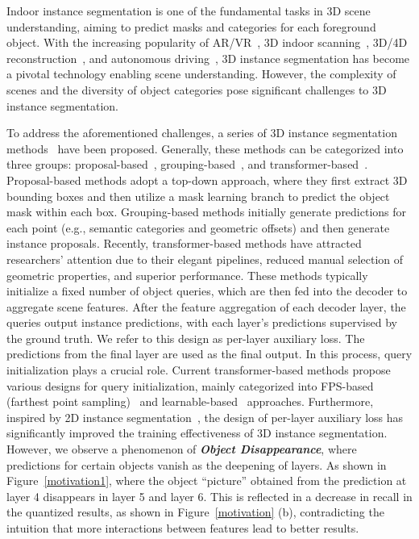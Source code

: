 \label{sec:intro}
Indoor instance segmentation is one of the fundamental tasks in 3D scene understanding, aiming to predict masks and categories for each foreground object. With the increasing popularity of AR/VR~\cite{park2020deep,manni2021snap2cad}, 3D indoor scanning~\cite{lehtola2017comparison,halber2019rescan}, 3D/4D reconstruction~\cite{wu20244d,zhu2024motiongs,lu2024dn,luiten2023dynamic,lu2024align3r,zhang2024monst3r}, and autonomous driving~\cite{neven2018towards,yurtsever2020survey}, 3D instance segmentation has become a pivotal technology enabling scene understanding. However, the complexity of scenes and the diversity of object categories pose significant challenges to 3D instance segmentation.


%
To address the aforementioned challenges, a series of 3D instance segmentation methods~\cite{yi2019gspn,hou20193d,yang2019learning,engelmann20203d,liu2020learning, chen2021hierarchical,liang2021instance,vu2022softgroup,schult2022mask3d,sun2023superpoint,lu2023query,lai2023mask} have been proposed. Generally, these methods can be categorized into three groups: proposal-based~\cite{yi2019gspn,hou20193d,yang2019learning}, grouping-based~\cite{engelmann20203d,liu2020learning,jiang2020pointgroup,chen2021hierarchical,liang2021instance,vu2022softgroup}, and transformer-based~\cite{schult2022mask3d,sun2023superpoint,lu2023query,lai2023mask}. Proposal-based methods adopt a top-down approach, where they first extract 3D bounding boxes and then utilize a mask learning branch to predict the object mask within each box. Grouping-based methods initially generate predictions for each point (e.g., semantic categories and geometric offsets) and then generate instance proposals. Recently, transformer-based methods have attracted researchers' attention due to their elegant pipelines, reduced manual selection of geometric properties, and superior performance. 
%
These methods typically initialize a fixed number of object queries, which are then fed into the decoder to aggregate scene features. 
%
After the feature aggregation of each decoder layer, the queries output instance predictions, with each layer's predictions supervised by the ground truth. We refer to this design as per-layer auxiliary loss. The predictions from the final layer are used as the final output.
%
In this process, query initialization plays a crucial role. Current transformer-based methods propose various designs for query initialization, mainly categorized into FPS-based (farthest point sampling)~\cite{schult2022mask3d,lu2023query} and learnable-based~\cite{sun2023superpoint,lai2023mask} approaches. Furthermore, inspired by 2D instance segmentation~\cite{cheng2022masked,li2023mask,jain2023oneformer}, the design of per-layer auxiliary loss has significantly improved the training effectiveness of 3D instance segmentation. However, we observe a phenomenon of \textit{\textbf{Object Disappearance}}, where predictions for certain objects vanish as the deepening of layers. As shown in Figure~\ref{motivation1}, where the object ``picture'' obtained from the prediction at layer 4 disappears in layer 5 and layer 6. This is reflected in a decrease in recall in the quantized results, as shown in Figure~\ref{motivation} (b), contradicting the intuition that more interactions between features lead to better results.
